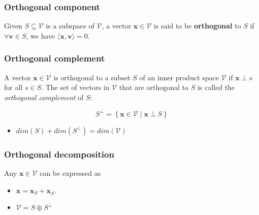 \subsubsection{Orthogonal component}
\begin{definition}
    Given \( S \subseteq \mathcal{V} \) is a subspace of \( \mathcal{V} \), a vector \( \mathbf{x} \in \mathcal{V} \) is said to be \textbf{orthogonal} to \( S \) if \( \forall \mathbf{v} \in S \), we have \( \langle \mathbf{x}, \mathbf{v} \rangle = 0 \).
\end{definition}

\subsubsection{Orthogonal complement}
\begin{definition}
    A vector $\mathbf{x} \in \mathcal{V}$ is orthogonal to a subset $S$ of an inner product space $\mathcal{V}$ if $\mathbf{x} \perp s$ for all $s \in S$. The set of vectors in $\mathcal{V}$ that are orthogonal to $S$ is called the \textit{orthogonal complement} of $S$:

    \begin{equation}
        S^\perp = \left\{ \mathbf{x} \in \mathcal{V} \mid \mathbf{x} \perp S \right\}
    \end{equation}
    \begin{itemize}
        \item $dim(S) + dim(S^\perp) = dim(\mathcal{V})$
    \end{itemize}
\end{definition}


\subsubsection{Orthogonal decomposition}
\begin{definition}
    Any $\mathbf{x} \in \mathcal{V}$ can be expressed as 
    \begin{itemize}
        \item $\mathbf{x} = \mathbf{x}_S + \mathbf{x}_{S^\perp}$
        \item $\mathcal{V} = S \oplus S^\perp$
    \end{itemize}
\end{definition}